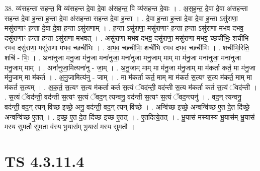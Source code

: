 \documentclass[17pt]{extarticle}
\begin{document}
38. व्य॑सहन्ता सहन्त॒ वि व्य॑सहन्त दे॒वा दे॒वा अ॑सहन्त॒ वि व्य॑सहन्त दे॒वाः । . अ॒स॒ह॒न्त॒ दे॒वा दे॒वा अ॑सहन्ता सहन्त दे॒वा ह॒न्ता ह॒न्ता दे॒वा अ॑सहन्ता सहन्त दे॒वा ह॒न्ता । . दे॒वा ह॒न्ता ह॒न्ता दे॒वा दे॒वा ह॒न्ता ऽसु॑राणा॒ मसु॑राणाꣳ ह॒न्ता दे॒वा दे॒वा ह॒न्ता ऽसु॑राणाम् । . ह॒न्ता ऽसु॑राणा॒ मसु॑राणाꣳ ह॒न्ता ह॒न्ता ऽसु॑राणा मभव दभव॒ दसु॑राणाꣳ ह॒न्ता ह॒न्ता ऽसु॑राणा मभवत् । . असु॑राणा मभव दभव॒ दसु॑राणा॒ मसु॑राणा मभव॒ च्छची॑भिः॒ शची॑भि रभव॒ दसु॑राणा॒ मसु॑राणा मभव॒ च्छची॑भिः । . अ॒भ॒व॒ च्छची॑भिः॒ शची॑भि रभव दभव॒ च्छची॑भिः । . शची॑भि॒रिति॒ शचि॑ - भिः॒ । . अना॑नुजा मनु॒जा म॑नु॒जा मना॑नुजा॒ मना॑नुजा मनु॒जाम् माम् मा म॑नु॒जा मना॑नुजा॒ मना॑नुजा मनु॒जाम् माम् । . अना॑नुजा॒मित्यना॑नु - जा॒म् । . अ॒नु॒जाम् माम् मा म॑नु॒जा म॑नु॒जाम् मा म॑कर्ता कर्त॒ मा म॑नु॒जा म॑नु॒जाम् मा म॑कर्त । . अ॒नु॒जामित्य॑नु - जाम् । . मा म॑कर्ता कर्त॒ माम् मा म॑कर्त स॒त्यꣳ स॒त्य म॑कर्त॒ माम् मा म॑कर्त स॒त्यम् । . अ॒क॒र्त॒ स॒त्यꣳ स॒त्य म॑कर्ता कर्त स॒त्यं ॅवद॑न्ती॒ वद॑न्ती स॒त्य म॑कर्ता कर्त स॒त्यं ॅवद॑न्ती । . स॒त्यं ॅवद॑न्ती॒ वद॑न्ती स॒त्यꣳ स॒त्यं ॅवद॒न् त्यन्वनु॒ वद॑न्ती स॒त्यꣳ स॒त्यं ॅवद॒न्त्यनु॑ । . वद॒न् त्यन्वनु॒ वद॑न्ती॒ वद॒न् त्यन्‌ वि॑च्छ इच्छे॒ अनु॒ वद॑न्ती॒ वद॒न् त्यन् वि॑च्छे । . अन्वि॑च्छ इच्छे॒ अन्वन्वि॑च्छ ए॒त दे॒त दि॑च्छे॒ अन्वन्वि॑च्छ ए॒तत् । . इ॒च्छ॒ ए॒त दे॒त दि॑च्छ इच्छ ए॒तत् । . ए॒तदित्ये॒तत् । . भू॒यास॑ मस्यास्य भू॒यास॑म् भू॒यास॑ मस्य सुम॒तौ सु॑म॒ता व॑स्य भू॒यास॑म् भू॒यास॑ मस्य सुम॒तौ । \newline
\pagebreak
{}

\section{ TS 4.3.11.4 }
\end{document}
